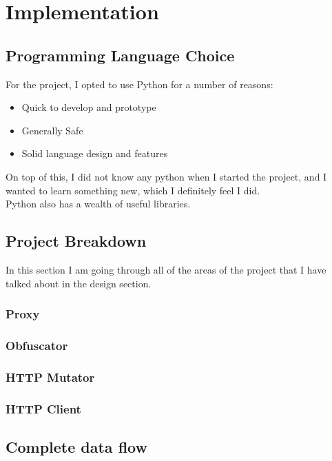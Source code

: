 \section{Implementation}
\subsection{Programming Language Choice}
For the project, I opted to use Python for a number of reasons:
\begin{itemize}
    \item Quick to develop and prototype
    \item Generally Safe
    \item Solid language design and features
\end{itemize}

On top of this, I did not know any python when I started the project, and I wanted to learn something new, which I definitely feel I did.\\
Python also has a wealth of useful libraries.

\subsection{Project Breakdown}
In this section I am going through all of the areas of the project that I have talked about in the design section.
\subsubsection{Proxy}
\subsubsection{Obfuscator}
\subsubsection{HTTP Mutator}
\subsubsection{HTTP Client}
\subsection{Complete data flow}
